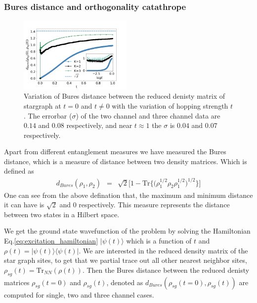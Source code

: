 \documentclass[reprint,prb,superscriptaddress]{revtex4-1}
\begin{document}
\subsubsection{Bures distance and orthogonality catathrope}
\begin{figure}[!htpb]
\includegraphics[width=0.49\textwidth]{plt/error_Bures_Distance_Ch123_10001}
\caption{Variation of Bures distance between the reduced denisty matrix of stargraph at $t=0$ and $t\neq 0$ with the variation of hopping  strength $t$. The errorbar ($\sigma$) of the two channel and three channel data are $0.14$ and $0.08$ respectively, and near $t\approx 1$ the $\sigma$ is $0.04$ and $0.07$ respectively.}
\label{fig:bures_distance}
\end{figure}
\noindent Apart from different entanglement measures we have measured the Bures distance, which is a measure of distance between two density matrices. Which is defined as 
\begin{eqnarray}
d_{Bures}(\rho_1,\rho_2) &=& \sqrt{2} \bigg[1- \textrm{Tr}\bigg\{ \bigg(\rho_1^{1/2}  \rho_2 \rho_{1}^{1/2}\bigg)^{1/2} \bigg\}\bigg]
\end{eqnarray}
One can see from the above defination that, the maximum and minimum distance it can have is $\sqrt{2}$ and $0$ respectively. This measure represents the distance between two states in a Hilbert space. 
\par We get the ground state wavefunction of the problem by solving the Hamiltonian Eq.\eqref{eq:excitation_hamiltonian} $|\psi(t)\rangle$ which is a function of $t$ and $\rho(t)= |\psi(t)\rangle \langle \psi(t)|$. We are interested in the reduced density matrix of the star graph sites, to get that we partial trace out all other nearest neighbor sites, $\rho_{sg}(t)=\textrm{Tr}_{NN}(\rho(t))$. Then the Bures distance between the reduced denisty matrices $\rho_{sg}(t=0)$ and $\rho_{sg}(t)$, denoted as $d_{Bures}(\rho_{sg}(t=0),\rho_{sg}(t))$ are computed for single, two and three channel cases.
\end{document}
